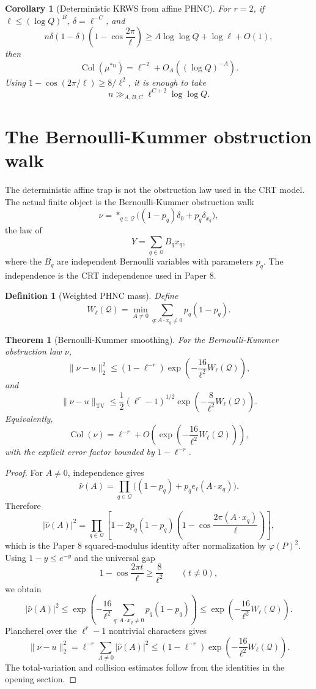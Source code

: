 \documentclass[11pt]{article}
\newtheorem{theorem}{Theorem}
\newtheorem{corollary}{Corollary}
\newtheorem{definition}{Definition}
\newcommand{\TV}{\mathrm{TV}}
\begin{document}
\begin{corollary}[Deterministic KRWS from affine PHNC]\label{C:det-krws}
For \(r=2\), if \(\ell\le(\log Q)^B\), \(\delta=\ell^{-C}\), and
\[
n\delta(1-\delta)\left(1-\cos\frac{2\pi}{\ell}\right)
\ge
A\log\log Q+\log\ell+O(1),
\]
then
\[
\operatorname{Col}(\mu^{*n})
=
\ell^{-2}+O_A((\log Q)^{-A}).
\]
Using \(1-\cos(2\pi/\ell)\ge8/\ell^2\), it is enough to take
\[
n\gg_{A,B,C}\ell^{C+2}\log\log Q.
\]
\end{corollary}

\section{The Bernoulli-Kummer obstruction walk}

The deterministic affine trap is not the obstruction law used in the CRT model.  The actual finite object is the Bernoulli-Kummer obstruction walk
\[
\nu
=
*_{q\in\mathcal Q}
\bigl((1-p_q)\delta_0+p_q\delta_{x_q}\bigr),
\]
the law of
\[
Y=\sum_{q\in\mathcal Q}B_qx_q,
\]
where the \(B_q\) are independent Bernoulli variables with parameters \(p_q\).  The independence is the CRT independence used in Paper 8.

\begin{definition}[Weighted PHNC mass]\label{D:weighted-mass}
Define
\[
W_\ell(\mathcal Q)
=
\min_{A\ne0}
\sum_{q:A\cdot x_q\ne0}p_q(1-p_q).
\]
\end{definition}

\begin{theorem}[Bernoulli-Kummer smoothing]\label{T:bernoulli-smoothing}
For the Bernoulli-Kummer obstruction law \(\nu\),
\[
\|\nu-u\|_2^2
\le
(1-\ell^{-r})
\exp\left(-\frac{16}{\ell^2}W_\ell(\mathcal Q)\right),
\]
and
\[
\|\nu-u\|_{\TV}
\le
\frac12(\ell^r-1)^{1/2}
\exp\left(-\frac{8}{\ell^2}W_\ell(\mathcal Q)\right).
\]
Equivalently,
\[
\operatorname{Col}(\nu)
=
\ell^{-r}
+O\left(
\exp\left(-\frac{16}{\ell^2}W_\ell(\mathcal Q)\right)
\right),
\]
with the explicit error factor bounded by \(1-\ell^{-r}\).
\end{theorem}

\begin{proof}
For \(A\ne0\), independence gives
\[
\widehat\nu(A)
=
\prod_{q\in\mathcal Q}
\bigl((1-p_q)+p_qe_\ell(A\cdot x_q)\bigr).
\]
Therefore
\[
|\widehat\nu(A)|^2
=
\prod_{q\in\mathcal Q}
\left[
1-2p_q(1-p_q)
\left(1-\cos\frac{2\pi(A\cdot x_q)}{\ell}\right)
\right],
\]
which is the Paper 8 squared-modulus identity after normalization by \(\varphi(P)^2\).  Using \(1-y\le e^{-y}\) and the universal gap
\[
1-\cos\frac{2\pi t}{\ell}\ge\frac8{\ell^2}
\qquad(t\ne0),
\]
we obtain
\[
|\widehat\nu(A)|^2
\le
\exp\left(
-\frac{16}{\ell^2}
\sum_{q:A\cdot x_q\ne0}p_q(1-p_q)
\right)
\le
\exp\left(-\frac{16}{\ell^2}W_\ell(\mathcal Q)\right).
\]
Plancherel over the \(\ell^r-1\) nontrivial characters gives
\[
\|\nu-u\|_2^2
=
\ell^{-r}\sum_{A\ne0}|\widehat\nu(A)|^2
\le
(1-\ell^{-r})
\exp\left(-\frac{16}{\ell^2}W_\ell(\mathcal Q)\right).
\]
The total-variation and collision estimates follow from the identities in the opening section.
\end{proof}
\end{document}
